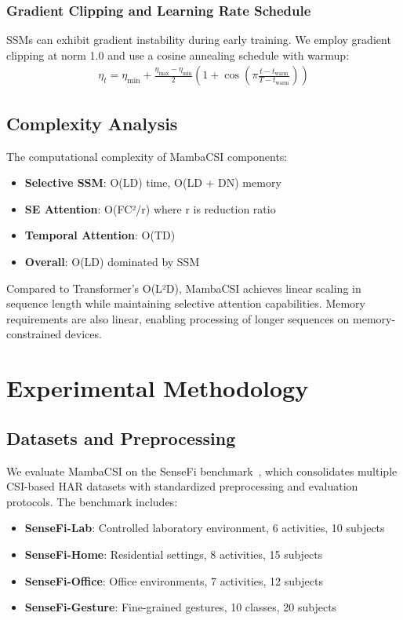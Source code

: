 \documentclass[journal]{IEEEtran}
\begin{document}
\subsubsection{Gradient Clipping and Learning Rate Schedule}
SSMs can exhibit gradient instability during early training. We employ gradient clipping at norm 1.0 and use a cosine annealing schedule with warmup:
\begin{align}
\eta_t = \eta_{\min} + \frac{\eta_{\max} - \eta_{\min}}{2}(1 + \cos(\pi \frac{t - t_{\text{warm}}}{T - t_{\text{warm}}}))
\end{align}

\subsection{Complexity Analysis}

The computational complexity of MambaCSI components:
\begin{itemize}
\item \textbf{Selective SSM}: O(LD) time, O(LD + DN) memory
\item \textbf{SE Attention}: O(FC²/r) where r is reduction ratio
\item \textbf{Temporal Attention}: O(TD)
\item \textbf{Overall}: O(LD) dominated by SSM
\end{itemize}

Compared to Transformer's O(L²D), MambaCSI achieves linear scaling in sequence length while maintaining selective attention capabilities. Memory requirements are also linear, enabling processing of longer sequences on memory-constrained devices.

\section{Experimental Methodology}

\subsection{Datasets and Preprocessing}

We evaluate MambaCSI on the SenseFi benchmark~\cite{yang2023sensefi}, which consolidates multiple CSI-based HAR datasets with standardized preprocessing and evaluation protocols. The benchmark includes:

\begin{itemize}
\item \textbf{SenseFi-Lab}: Controlled laboratory environment, 6 activities, 10 subjects
\item \textbf{SenseFi-Home}: Residential settings, 8 activities, 15 subjects  
\item \textbf{SenseFi-Office}: Office environments, 7 activities, 12 subjects
\item \textbf{SenseFi-Gesture}: Fine-grained gestures, 10 classes, 20 subjects
\end{itemize}
\end{document}
